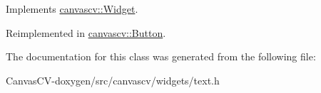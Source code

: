 Implements \hyperlink{classcanvascv_1_1Widget_a85884269bd53ab91203f099a586efa43}{canvascv\+::\+Widget}.



Reimplemented in \hyperlink{classcanvascv_1_1Button_ace294c72ce39507268ffd752f4ca0034}{canvascv\+::\+Button}.



The documentation for this class was generated from the following file\+:\begin{DoxyCompactItemize}
\item 
Canvas\+C\+V-\/doxygen/src/canvascv/widgets/text.\+h\end{DoxyCompactItemize}
